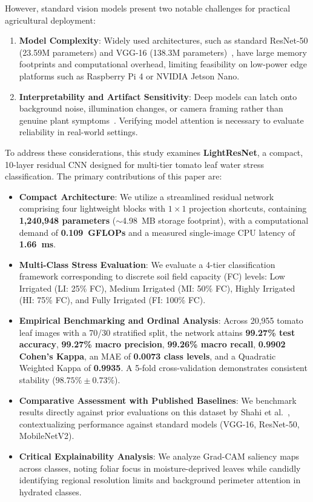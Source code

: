 \documentclass[conference]{IEEEtran}
\begin{document}
However, standard vision models present two notable challenges for practical agricultural deployment:
\begin{enumerate}
    \item \textbf{Model Complexity}: Widely used architectures, such as standard ResNet-50 (23.59M parameters) and VGG-16 (138.3M parameters)~\cite{he2016deep, simonyan2014very}, have large memory footprints and computational overhead, limiting feasibility on low-power edge platforms such as Raspberry Pi 4 or NVIDIA Jetson Nano.
    \item \textbf{Interpretability and Artifact Sensitivity}: Deep models can latch onto background noise, illumination changes, or camera framing rather than genuine plant symptoms~\cite{tjoa2020survey}. Verifying model attention is necessary to evaluate reliability in real-world settings.
\end{enumerate}

To address these considerations, this study examines \textbf{LightResNet}, a compact, 10-layer residual CNN designed for multi-tier tomato leaf water stress classification. The primary contributions of this paper are:
\begin{itemize}
    \item \textbf{Compact Architecture}: We utilize a streamlined residual network comprising four lightweight blocks with $1 \times 1$ projection shortcuts, containing \textbf{1,240,948 parameters} ($\sim$4.98~MB storage footprint), with a computational demand of \textbf{0.109~GFLOPs} and a measured single-image CPU latency of \textbf{1.66~ms}.
    \item \textbf{Multi-Class Stress Evaluation}: We evaluate a 4-tier classification framework corresponding to discrete soil field capacity (FC) levels: Low Irrigated (LI: 25\% FC), Medium Irrigated (MI: 50\% FC), Highly Irrigated (HI: 75\% FC), and Fully Irrigated (FI: 100\% FC).
    \item \textbf{Empirical Benchmarking and Ordinal Analysis}: Across 20,955 tomato leaf images with a 70/30 stratified split, the network attains \textbf{99.27\% test accuracy}, \textbf{99.27\% macro precision}, \textbf{99.26\% macro recall}, \textbf{0.9902 Cohen's Kappa}, an MAE of \textbf{0.0073 class levels}, and a Quadratic Weighted Kappa of \textbf{0.9935}. A 5-fold cross-validation demonstrates consistent stability ($98.75\% \pm 0.73\%$).
    \item \textbf{Comparative Assessment with Published Baselines}: We benchmark results directly against prior evaluations on this dataset by Shahi et al.~\cite{shahi2025deep}, contextualizing performance against standard models (VGG-16, ResNet-50, MobileNetV2).
    \item \textbf{Critical Explainability Analysis}: We analyze Grad-CAM saliency maps across classes, noting foliar focus in moisture-deprived leaves while candidly identifying regional resolution limits and background perimeter attention in hydrated classes.
\end{itemize}
\end{document}
